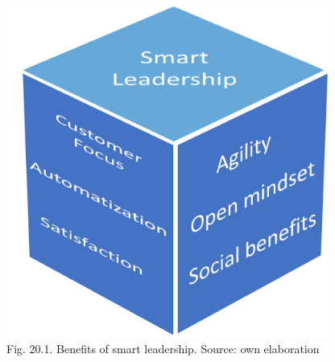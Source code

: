 \documentclass[
  letterpaper,
  DIV=11,
  numbers=noendperiod]{scrreprt}
\begin{document}
\begin{figure}

{\centering \includegraphics[width=4.16667in,height=\textheight]{img/fig32.png}

}

\caption{Fig. 20.1. Benefits of smart leadership. Source: own
elaboration}

\end{figure}
\end{document}
